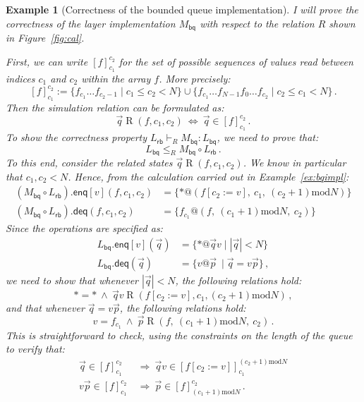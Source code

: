 \documentclass[11pt,oneside]{book}
\newtheorem{example}[theorem]{Example}
\theoremstyle{definition}
\newcommand{\kw}[1]{\ensuremath{ \mathsf{#1} }}
\begin{document}
\begin{example}[Correctness of the bounded queue implementation] %
I will prove the correctness of
the layer implementation $M_\kw{bq}$
with respect to the relation $R$
shown in Figure~\ref{fig:cal}.

First,
we can write $[f]_{c_1}^{c_2}$
for the set of possible sequences of values
read between indices $c_1$ and $c_2$
within the array $f$.
More precisely:
\[
  [f]_{c_1}^{c_2} :=
    \{ f_{c_1} \ldots f_{c_2 - 1} \mid c_1 \le c_2 < N \} \cup
    \{ f_{c_1} \ldots f_{N-1} f_0 \ldots f_{c_2} \mid c_2 \le c_1 < N \}
  \,.
\]
Then the simulation relation can be formulated as:
\[
  \vec{q} \mathrel{R} (f, c_1, c_2)
  \: \Leftrightarrow \:
  \vec{q} \in [f]_{c_1}^{c_2}
  \,.
\]
To show the correctness property
$
  L_\kw{rb} \vdash_R M_\kw{bq} : L_\kw{bq}
$,
we need to prove that:
\[
  L_\kw{bq} \le_R M_\kw{bq} \circ L_\kw{rb}
  \,.
\]
To this end,
consider the related states
$\vec{q} \mathrel{R} (f, c_1, c_2)$.
We know in particular that $c_1, c_2 < N$.
Hence, from the calculation
carried out in Example~\ref{ex:bqimpl}:
\begin{align*}
  (M_\kw{bq} \circ L_\kw{rb}).{\kw{enq}[v]}(f, c_1, c_2)
    &= \{ *@(f[c_2 := v], \:
          c_1, \:
          (c_2 + 1) \mathbin{\mathrm{mod}} N) \}
  \\
  (M_\kw{bq} \circ L_\kw{rb}).\kw{deq}(f, c_1, c_2)
    &= \{ f_{c_1}@(f, \:
          (c_1 + 1) \mathbin{\mathrm{mod}} N, \:
          c_2) \}
\end{align*}
Since the operations are specified as:
\begin{align*}
  L_\kw{bq}.\kw{enq}[v](\vec{q}) &=
    \{ * @ \vec{q} v \mid |\vec{q}| < N \}
  \\
  L_\kw{bq}.\kw{deq}(\vec{q}) &=
    \{ v @ \vec{p} \: \mid \vec{q} = v \vec{p} \}
  \,,
\end{align*}
we need to show that whenever
$|\vec{q}| < N$,
the following relations hold:
\[
  {*} = {*}
  \: \wedge \:
  \vec{q}v \mathrel{R}
    (f[c_2 := v], c_1, (c_2 + 1) \mathbin{\mathrm{mod}} N)
  \,,
\]
and that whenever $\vec{q} = v\vec{p}$,
the following relations hold:
\[
  v = f_{c_1}
  \: \wedge \:
  \vec{p} \mathrel{R}
    (f, \:
     (c_1 + 1) \mathbin{\mathrm{mod}} N, \:
     c_2)
  \,.
\]
This is straightforward to check,
using the constraints on the length of the queue
to verify that:
\begin{align*}
  \vec{q} \in [f]_{c_1}^{c_2}
    \: &\Rightarrow \:
    \vec{q}v \in [f[c_2 := v]]_{c_1}^{(c_2+1) \mathbin{\mathrm{mod}} N}
  \\
  v\vec{p} \in [f]_{c_1}^{c_2}
    \: &\Rightarrow \:
    \vec{p} \in [f]_{(c_1+1) \mathbin{\mathrm{mod}} N}^{c_2}
  \,.
\end{align*}
\end{example}
\end{document}

